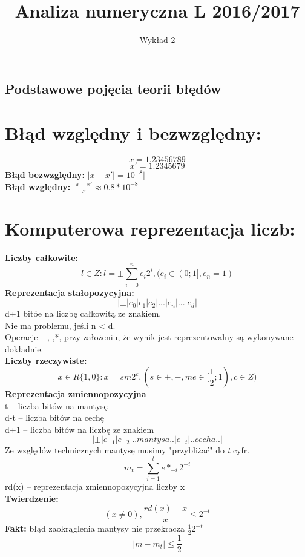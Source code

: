\documentclass[12pt]{article}
\author{\LARGE Wykład 2}
\title{\bfseries\Huge Analiza numeryczna L 2016/2017}
\date{}
\begin{document}
\maketitle
\begin{center}
\section*{\Large Podstawowe pojęcia teorii błędów }
\end{center}

\section*{Błąd względny i bezwzględny:}
$$ x = 1.23456789$$
$$ x' = 1.2345679$$
\linebreak
\textbf{Błąd bezwzględny:} $|x-x'|=10^{-8}|$\\
\linebreak
\textbf{Błąd względny:} $|\frac{x-x'}{x} \approx 0.8*10^{-8}$\\
\linebreak
\section*{Komputerowa reprezentacja liczb:}
\textbf{Liczby całkowite:}
$$l \in Z : l= \pm \sum^n_{i=0} e_i2^i, (e_i \in (0;1], e_n = 1)$$
\linebreak
\textbf{Reprezentacja stałopozycyjna:}
$$|\pm|e_0|e_1|e_2|...|e_n|...|e_d|$$ 
d+1 bitóe na liczbę całkowitą ze znakiem.\\
Nie ma problemu, jeśli n < d.\\
Operacje +,-,*, przy założeniu, że wynik jest reprezentowalny są wykonywane dokładnie.\\
\textbf{Liczby rzeczywiste:}
$$ x \in R\{1,0\}: x= sm2^c, (s \in {+,-}, me \in [\frac{1}{2};1), c \in Z)$$
\linebreak
\textbf{Reprezentacja zmiennopozycyjna}\\
\linebreak
t -- liczba bitów na mantysę\\
d-t -- liczba bitów na cechę\\
d+1 -- liczba bitów na liczbę ze znakiem\\
\linebreak
$$|\pm|e_{-1}|e_{-2}| ..mantysa.. |e_{-t}|..cecha..|$$
Ze względów technicznych mantysę musimy "przybliżać" do \textit{t} cyfr.
$$ m_t = \sum^t_{i=1}e*_{-i}2^{-i}$$
rd(x) -- reprezentacja zmiennopozycyjna liczby x\\
\linebreak
\textbf{Twierdzenie:}
$$(x \neq 0), \frac{rd(x)-x}{x} \leq 2^{-t}$$ 
\textbf{Fakt:} błąd zaokrąglenia mantysy nie przekracza $\frac{1}{2}2^{-t}$
$$|m-m_t| \leq \frac{1}{2} $$
\end{document}
